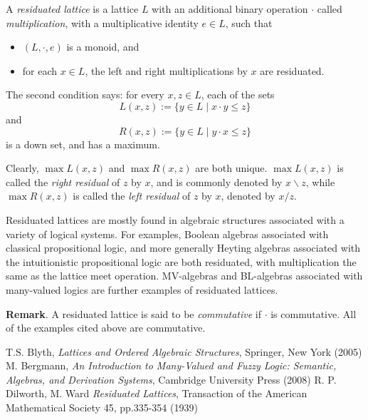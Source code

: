 \documentclass[12pt]{article}
\begin{document}
A \emph{residuated lattice} is a lattice $L$ with an additional binary operation $\cdot$ called \emph{multiplication}, with a multiplicative identity $e\in L$, such that
\begin{itemize}
\item $(L,\cdot, e)$ is a monoid, and
\item for each $x\in L$, the left and right multiplications by $x$ are residuated.  
\end{itemize}
The second condition says: for every $x,z\in L$, each of the sets $$L(x,z):=\lbrace y \in L \mid x\cdot y \le z \rbrace$$ and $$R(x,z):=\lbrace y \in L \mid y\cdot x \le z\rbrace$$ is a down set, and has a maximum.

Clearly, $\max L(x,z)$ and $\max R(x,z)$ are both unique.  $\max L(x,z)$ is called the \emph{right residual} of $z$ by $x$, and is commonly denoted by $x \backslash z$, while $\max R(x,z)$ is called the \emph{left residual} of $z$ by $x$, denoted by $x/z$.

Residuated lattices are mostly found in algebraic structures associated with a variety of logical systems.  For examples, Boolean algebras associated with classical propositional logic, and more generally Heyting algebras associated with the intuitionistic propositional logic are both residuated, with multiplication the same as the lattice meet operation.  MV-algebras and BL-algebras associated with many-valued logics are further examples of residuated lattices.

\textbf{Remark}.  A residuated lattice is said to be \emph{commutative} if $\cdot$ is commutative.  All of the examples cited above are commutative.

\begin{thebibliography}{6}
 T.S. Blyth, {\em Lattices and Ordered Algebraic Structures}, Springer, New York (2005)
 M. Bergmann, {\it An Introduction to Many-Valued and Fuzzy Logic: Semantic, Algebras, and Derivation Systems}, Cambridge University Press (2008)
 R. P. Dilworth, M. Ward {\it Residuated Lattices}, Transaction of the American Mathematical Society 45, pp.335-354 (1939)
\end{thebibliography}
\end{document}
